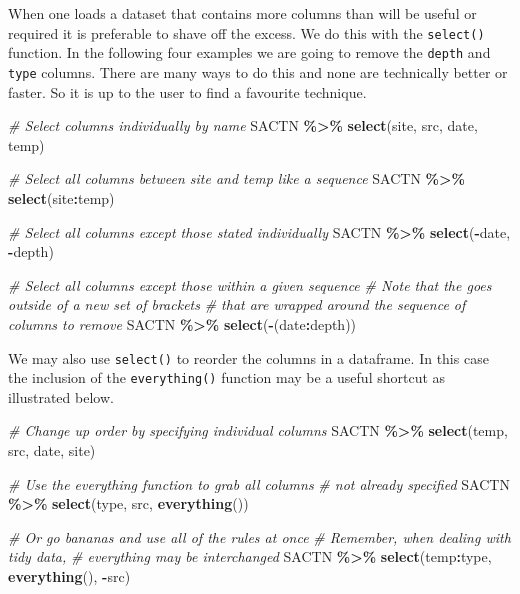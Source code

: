 \documentclass[
]{book}
\newenvironment{Shaded}{\begin{snugshade}}{\end{snugshade}}
\newcommand{\CommentTok}[1]{\textcolor[rgb]{0.56,0.35,0.01}{\textit{#1}}}
\newcommand{\KeywordTok}[1]{\textcolor[rgb]{0.13,0.29,0.53}{\textbf{#1}}}
\newcommand{\NormalTok}[1]{#1}
\newcommand{\OperatorTok}[1]{\textcolor[rgb]{0.81,0.36,0.00}{\textbf{#1}}}
\newcommand{\StringTok}[1]{\textcolor[rgb]{0.31,0.60,0.02}{#1}}
\begin{document}
When one loads a dataset that contains more columns than will be useful or required it is preferable to shave off the excess. We do this with the \texttt{select()} function. In the following four examples we are going to remove the \texttt{depth} and \texttt{type} columns. There are many ways to do this and none are technically better or faster. So it is up to the user to find a favourite technique.

\begin{Shaded}
\begin{Highlighting}[]
\CommentTok{\# Select columns individually by name}
\NormalTok{SACTN }\OperatorTok{\%>\%}\StringTok{ }
\StringTok{  }\KeywordTok{select}\NormalTok{(site, src, date, temp)}

\CommentTok{\# Select all columns between site and temp like a sequence}
\NormalTok{SACTN }\OperatorTok{\%>\%}\StringTok{ }
\StringTok{  }\KeywordTok{select}\NormalTok{(site}\OperatorTok{:}\NormalTok{temp)}

\CommentTok{\# Select all columns except those stated individually}
\NormalTok{SACTN }\OperatorTok{\%>\%}\StringTok{ }
\StringTok{  }\KeywordTok{select}\NormalTok{(}\OperatorTok{{-}}\NormalTok{date, }\OperatorTok{{-}}\NormalTok{depth)}

\CommentTok{\# Select all columns except those within a given sequence}
  \CommentTok{\# Note that the \textquotesingle{}{-}\textquotesingle{} goes outside of a new set of brackets}
  \CommentTok{\# that are wrapped around the sequence of columns to remove}
\NormalTok{SACTN }\OperatorTok{\%>\%}\StringTok{ }
\StringTok{  }\KeywordTok{select}\NormalTok{(}\OperatorTok{{-}}\NormalTok{(date}\OperatorTok{:}\NormalTok{depth))}
\end{Highlighting}
\end{Shaded}

We may also use \texttt{select()} to reorder the columns in a dataframe. In this case the inclusion of the \texttt{everything()} function may be a useful shortcut as illustrated below.

\begin{Shaded}
\begin{Highlighting}[]
\CommentTok{\# Change up order by specifying individual columns}
\NormalTok{SACTN }\OperatorTok{\%>\%}\StringTok{ }
\StringTok{  }\KeywordTok{select}\NormalTok{(temp, src, date, site)}

\CommentTok{\# Use the everything function to grab all columns }
\CommentTok{\# not already specified}
\NormalTok{SACTN }\OperatorTok{\%>\%}\StringTok{ }
\StringTok{  }\KeywordTok{select}\NormalTok{(type, src, }\KeywordTok{everything}\NormalTok{())}

\CommentTok{\# Or go bananas and use all of the rules at once}
  \CommentTok{\# Remember, when dealing with tidy data,}
  \CommentTok{\# everything may be interchanged}
\NormalTok{SACTN }\OperatorTok{\%>\%}\StringTok{ }
\StringTok{  }\KeywordTok{select}\NormalTok{(temp}\OperatorTok{:}\NormalTok{type, }\KeywordTok{everything}\NormalTok{(), }\OperatorTok{{-}}\NormalTok{src)}
\end{Highlighting}
\end{Shaded}
\end{document}
